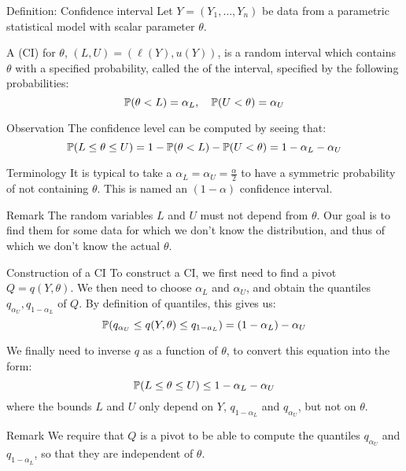 \documentclass[a4paper]{article}
\begin{document}
\begin{parag}{Definition: Confidence interval}
    Let $Y = \left(Y_1, \ldots, Y_n\right)$ be data from a parametric statistical model with scalar parameter $\theta$. 

    A  (CI) for $\theta$, $\left(L, U\right) = \left(\ell \left(Y\right), u\left(Y\right)\right)$, is a random interval which contains $\theta$ with a specified probability, called the  of the interval, specified by the following probabilities: 
    \[\prob\left(\theta < L\right) = \alpha_L, \mathspace \prob\left(U < \theta\right) = \alpha_U \]
    
    \begin{subparag}{Observation}
        The confidence level can be computed by seeing that: 
        \[\prob\left(L \leq \theta \leq U\right) = 1 - \prob\left(\theta < L\right) - \prob\left(U < \theta\right) = 1 - \alpha_L - \alpha_U\]
    \end{subparag}
    
    \begin{subparag}{Terminology}
        It is typical to take a $\alpha_L = \alpha_U = \frac{\alpha}{2}$ to have a symmetric probability of not containing $\theta$. This is named an  $\left(1-\alpha\right)$ confidence interval.
    \end{subparag}
    
    \begin{subparag}{Remark}
        The random variables $L$ and $U$ must not depend from $\theta$. Our goal is to find them for some data for which we don't know the distribution, and thus of which we don't know the actual $\theta$.
    \end{subparag}
\end{parag}

\begin{parag}{Construction of a CI}
    To construct a CI, we first need to find a pivot $Q = q\left(Y, \theta\right)$. We then need to choose $\alpha_L$ and $\alpha_U$, and obtain the quantiles $q_{\alpha_U}, q_{1 - \alpha_L}$ of $Q$. By definition of quantiles, this gives us: 
    \[\prob\left(q_{\alpha_U} \leq q\left(Y, \theta\right) \leq q_{1 - a_L}\right) = \left(1 - \alpha_L\right) - \alpha_U\]
    
    We finally need to inverse $q$ as a function of $\theta$, to convert this equation into the form:
    \[\prob\left(L \leq \theta \leq U\right) \leq 1 - \alpha_L - \alpha_U\]
    where the bounds $L$ and $U$ only depend on $Y$, $q_{1 - \alpha_L}$ and $q_{\alpha_U}$, but not on $\theta$.

    \begin{subparag}{Remark}
        We require that $Q$ is a pivot to be able to compute the quantiles $q_{\alpha_U}$ and $q_{1 - \alpha_L}$, so that they are independent of $\theta$.
    \end{subparag}
\end{parag}
\end{document}
